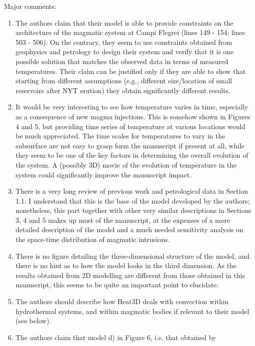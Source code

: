 \documentclass[a4paper,notitlepage]{article}
\begin{document}
Major comments:
\begin{enumerate}
  \item The authors claim that their model is able to provide constraints on
    the architecture of the magmatic system at Campi Flegrei (lines 149 - 154;
    lines 503 - 506).
    On the contrary, they seem to use constraints obtained from geophysics and
    petrology
    to design their system and verify that it is one possible solution that
    matches the observed data in terms of measured temperatures. Their claim can
    be justified only if they are able to show that starting from different
    assumptions (e.g., different size/location of small reservoirs after NYT
    erution) they obtain significantly different results.
  \item It would
    be very interesting to see how temperature varies in time, especially as a
    consequence of new magma injections. This is somehow
    shown in Figures 4 and 5, but providing
    time series of temperature at various locations would be much appreciated.
    The time scales for temperatures to vary in the subsurface are not easy to
    grasp form the manuscript if present at all, while they seem to be one of
    the key factors in determining the overall evolution of the system. A
    (possibly 3D) movie of the evolution of temperature in the system
    could significantly improve the manuscript impact.
  \item There is a very long review of previous work and petrological data in
    Section 1.1. I understand that this is the base of the model developed by
    the authors; nonetheless, this part together with other very similar
    descriptions in Sections 3, 4 and 5 makes up most of the manuscript, at the
    expenses of a more detailed description of the model and a much needed
    sensitivity analysis on the space-time distribution of magmatic intrusions.
  \item There is no figure detailing the three-dimensional structure of the
    model, and there is no hint as to how the model looks in the third
    dimension. As the results obtained from 2D modelling are different
    from those obtained in this manuscript, this seems to be quite an important
    point to elucidate.
  \item The authors should describe how Heat3D deals with convection within
    hydrothermal systems, and within magmatic bodies if relevant to their model
    (see below).
  \item The authors claim that model d) in Figure 6, i.e. that obtained by

\end{enumerate}
\end{document}
